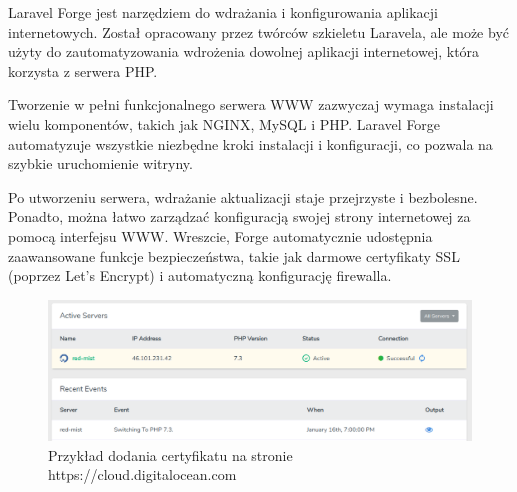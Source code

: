 Laravel Forge jest narzędziem do wdrażania i konfigurowania aplikacji internetowych. Został opracowany przez twórców szkieletu Laravela, ale może być użyty do zautomatyzowania wdrożenia dowolnej aplikacji internetowej, która korzysta z serwera PHP.

Tworzenie w pełni funkcjonalnego serwera WWW zazwyczaj wymaga instalacji wielu komponentów, takich jak NGINX, MySQL i PHP. Laravel Forge automatyzuje wszystkie niezbędne kroki instalacji i konfiguracji, co pozwala na szybkie uruchomienie witryny.

Po utworzeniu serwera, wdrażanie aktualizacji staje przejrzyste i bezbolesne. Ponadto, można łatwo zarządzać konfiguracją swojej strony internetowej za pomocą interfejsu WWW. Wreszcie, Forge automatycznie udostępnia zaawansowane funkcje bezpieczeństwa, takie jak darmowe certyfikaty SSL (poprzez Let's Encrypt) i automatyczną konfigurację firewalla.

\begin{figure}[H]
    \centering
    \includegraphics[width=6in]{images/forge.png}
    \caption{Przykład dodania certyfikatu na stronie https://cloud.digitalocean.com \label{fig:forge}}
\end{figure}